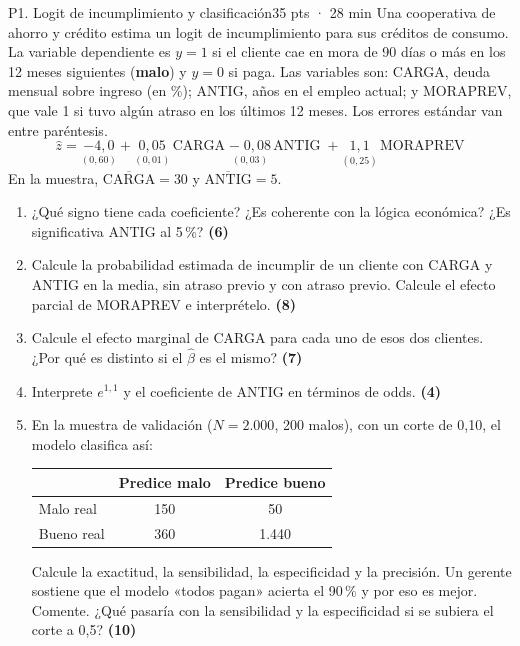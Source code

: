 \documentclass[11pt,a4paper]{article}
\newcommand{\pts}[1]{\hfill\textbf{\small(#1)}}
\begin{document}
\begin{preg}{P1. Logit de incumplimiento y clasificación}{35 pts · 28 min}
Una cooperativa de ahorro y crédito estima un logit de incumplimiento para sus créditos de consumo. La variable dependiente es $y=1$ si el cliente cae en mora de 90 días o más en los 12 meses siguientes (\textbf{malo}) y $y=0$ si paga. Las variables son: CARGA, deuda mensual sobre ingreso (en \%); ANTIG, años en el empleo actual; y MORAPREV, que vale 1 si tuvo algún atraso en los últimos 12 meses. Los errores estándar van entre paréntesis.
\[
\hat z=\underset{(0{,}60)}{-4{,}0}+\underset{(0{,}01)}{0{,}05}\,\text{CARGA}\;\underset{(0{,}03)}{-\;0{,}08}\,\text{ANTIG}\;+\underset{(0{,}25)}{1{,}1}\,\text{MORAPREV}
\]
En la muestra, $\overline{\text{CARGA}}=30$ y $\overline{\text{ANTIG}}=5$.
\begin{enumerate}[label=\alph*),leftmargin=*,itemsep=2pt]
\item ¿Qué signo tiene cada coeficiente? ¿Es coherente con la lógica económica? ¿Es significativa ANTIG al 5\,\%? \pts{6}
\item Calcule la probabilidad estimada de incumplir de un cliente con CARGA y ANTIG en la media, sin atraso previo y con atraso previo. Calcule el efecto parcial de MORAPREV e interprételo. \pts{8}
\item Calcule el efecto marginal de CARGA para cada uno de esos dos clientes. ¿Por qué es distinto si el $\hat\beta$ es el mismo? \pts{7}
\item Interprete $e^{1{,}1}$ y el coeficiente de ANTIG en términos de odds. \pts{4}
\item En la muestra de validación ($N=2.000$, 200 malos), con un corte de 0,10, el modelo clasifica así:
\begin{center}\small
\begin{tabular}{lcc}\toprule
 & Predice malo & Predice bueno\\\midrule
Malo real & 150 & 50\\
Bueno real & 360 & 1.440\\\bottomrule
\end{tabular}
\end{center}
Calcule la exactitud, la sensibilidad, la especificidad y la precisión. Un gerente sostiene que el modelo «todos pagan» acierta el 90\,\% y por eso es mejor. Comente. ¿Qué pasaría con la sensibilidad y la especificidad si se subiera el corte a 0,5? \pts{10}
\end{enumerate}
\end{preg}
\end{document}
